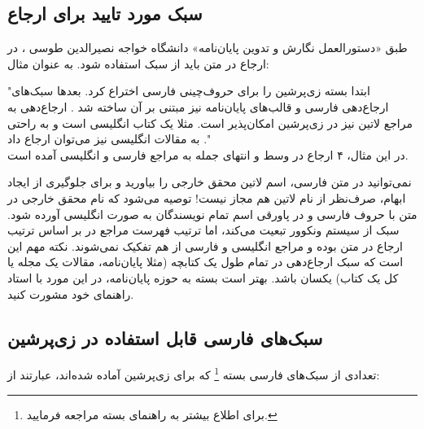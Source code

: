 \subsection{سبک مورد تایید برای ارجاع}
طبق «دستورالعمل نگارش و تدوین پایان‌نامه» دانشگاه خواجه نصیرالدین طوسی
\cite{KNTUThesisGuide}،
در ارجاع در متن باید از سبک
استفاده شود.
به عنوان مثال:


"ابتدا
\cite{Khalighi87xepersian}
بسته زی‌پرشین را برای حروف‌چینی فارسی اختراع کرد. بعدها سبک‌های ارجاع‌دهی فارسی و قالب‌های پایان‌نامه نیز مبتنی بر آن ساخته شد
\citep{persianbib87userguide}.
ارجاع‌دهی به مراجع لاتین نیز در زی‌پرشین امکان‌پذیر است. مثلا
یک کتاب انگلیسی است و به راحتی به مقالات انگلیسی نیز می‌توان ارجاع داد
."\\
در این مثال، ۴ ارجاع در وسط و انتهای جمله به مراجع فارسی و انگلیسی آمده است.

نمی‌توانید در متن فارسی، اسم لاتین محقق خارجی را بیاورید و برای جلوگیری از ایجاد ابهام، صرف‌نظر از نام لاتین هم مجاز نیست! توصیه می‌شود که نام محقق خارجی در متن با حروف فارسی و در پاورقی اسم تمام نویسندگان به صورت انگلیسی آورده شود.
سبک
از سیستم ونکوور تبعیت می‌کند، اما ترتیب فهرست مراجع در
بر اساس ترتیب ارجاع در متن بوده و
مراجع انگلیسی و فارسی از هم تفکیک نمی‌شوند.
نکته مهم این است که
سبک ارجاع‌دهی در تمام طول یک کتابچه
(مثلا پایان‌نامه، مقالات یک مجله یا کل یک کتاب) یکسان باشد. بهتر است
بسته به حوزه پایان‌نامه،
در این مورد با استاد راهنمای خود مشورت کنید.

\subsection{سبک‌های فارسی قابل استفاده در زی‌پرشین}
تعدادی از سبک‌های فارسی بسته
%
\footnote{ برای اطلاع بیشتر به راهنمای بسته
مراجعه فرمایید.}
که برای زی‌پرشین آماده شده‌اند، عبارتند از:

